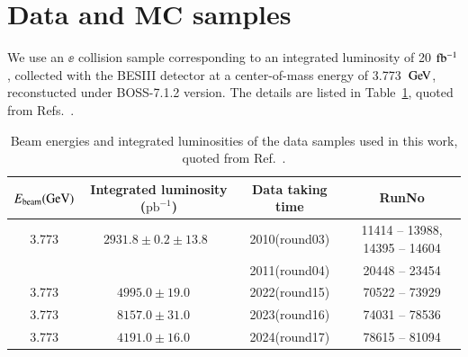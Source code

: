\section{Data and MC samples}
\label{sec:sample}
We use an $\ee$ collision sample corresponding to an integrated luminosity of 20 $\mbox{fb$^{-1}$}$, collected with the BESIII detector at a center-of-mass energy of 3.773 $\gev$, reconstucted under BOSS-7.1.2 version. The details are listed in Table~\ref{tab:datalumi}, quoted from Refs.~\cite{BESIII_lumi0304, BESIII_lumi_2024}.

\begin{table}[t]
    \begin{center}
        \caption{Beam energies and integrated luminosities of the data samples used in this work, quoted from Ref.~\cite{BESIII_lumi0304, BESIII_lumi_2024}.}
        \vspace{4mm}
        \begin{tabular}{c | c | c | c}
            \hline \hline

            $E_{\text{beam}} (\rm GeV)$            & Integrated luminosity
            ($\text{pb}^{-1}$)                     & Data taking time                               & RunNo                          \\
            \hline
            3.773                                  & \( 2931.8 \pm
            0.2 \pm 13.8 \)~\cite{BESIII_lumi0304} & 2010(round03)                                  & 11414 -- 13988, 14395 -- 14604 \\                                                         &                                                                                    &
            2011(round04)                          & 20448 -- 23454                                                                  \\
            \hline
            3.773                                  & \( 4995.0 \pm 19.0 \) ~\cite{BESIII_lumi_2024} &
            2022(round15)                          & 70522 -- 73929                                                                  \\
            \hline
            3.773                                  & \( 8157.0 \pm 31.0 \) ~\cite{BESIII_lumi_2024} &
            2023(round16)                          & 74031 -- 78536                                                                  \\
            \hline
            3.773                                  & \( 4191.0 \pm 16.0 \) ~\cite{BESIII_lumi_2024} &
            2024(round17)                          & 78615 -- 81094                                                                  \\
            \hline \hline
        \end{tabular}
        \label{tab:datalumi}
    \end{center}
\end{table}


